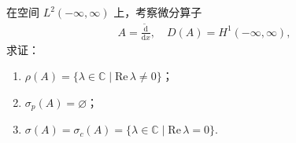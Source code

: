 \documentclass[../../main.tex]{subfiles}%
\begin{document}
\begin{example}
在空间 $L^2(-\infty,\infty)$ 上，考察微分算子
\begin{align*}
A=\frac{\widetilde{\mathrm{d}}}{\mathrm{d}x},\quad D(A)=H^1(-\infty,\infty),
\end{align*}
求证：
\begin{enumerate}[(1)]
\item $\rho(A)=\{\lambda\in\mathbb{C}\mid\mathrm{Re}\,\lambda\neq0\}$；
\item $\sigma_p(A)=\varnothing $；
\item $\sigma(A)=\sigma_c(A)=\{\lambda\in\mathbb{C}\mid\mathrm{Re}\,\lambda=0\}$.
\end{enumerate}
\end{example}
\end{document}
